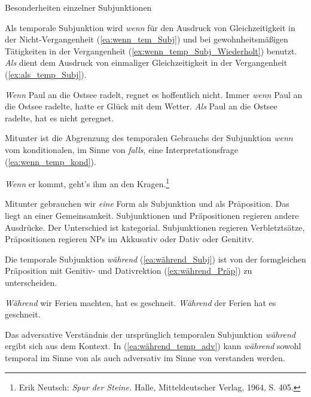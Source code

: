 \begin{Exkurs}{Besonderheiten einzelner Subjunktionen}\label{Exkurs:Subjunktionen}
    
Als temporale Subjunktion wird \textit{wenn} für den Ausdruck von Gleichzeitigkeit in der Nicht-Vergangenheit (\ref{ea:wenn_tem_Subj}) und bei gewohnheitsmäßigen Tätigkeiten in der Vergangenheit (\ref{ex:wenn_temp_Subj_Wiederholt}) benutzt. \textit{Als} dient dem Ausdruck von einmaliger Gleichzeitigkeit in der Vergangenheit (\ref{ex:als_temp_Subj}).

\newpage
\ea \label{ea:wenn_als_Subj_temp}
\ea \label{ea:wenn_tem_Subj} \textit{Wenn} Paul an die Ostsee radelt, regnet es hoffentlich nicht.
\ex \label{ex:wenn_temp_Subj_Wiederholt} Immer \textit{wenn} Paul an die Ostsee radelte, hatte er Glück mit dem Wetter.
\ex \label{ex:als_temp_Subj} \textit{Als} Paul an die Ostsee radelte, hat es nicht geregnet.
\z 
\z 

Mitunter ist die Abgrenzung des temporalen Gebrauchs der Subjunktion \textit{wenn} vom konditionalen, im Sinne von \textit{falls}, eine Interpretationsfrage (\ref{ea:wenn_temp_kond}).

\ea \label{ea:wenn_temp_kond} \textit{Wenn} er kommt, geht's ihm an den Kragen.\footnote{Erik Neutsch: \textit{Spur der Steine.} Halle, Mitteldeutscher Verlag, 1964, S. 405.}
\z 

Mitunter gebrauchen wir \textit{eine} Form als Subjunktion und als Präposition. Das liegt an einer Gemeinsamkeit. Subjunktionen und Präpositionen regieren andere Ausdrücke. Der Unterschied ist kategorial. Subjunktionen regieren Verbletztsätze, Präpositionen regieren NPs im Akkusativ oder Dativ oder Genititv.  

Die temporale Subjunktion \textit{während} (\ref{ea:während_Subj}) ist von der formgleichen Präposition mit Genitiv- und Dativrektion (\ref{ex:während_Präp}) zu unterscheiden. 

\ea \label{ea:während_Subj_Präp}
\ea \label{ea:während_Subj} \textit{Während} wir Ferien machten, hat es geschneit.
\ex \label{ex:während_Präp} \textit{Während} der Ferien hat es geschneit.
\z 
\z 

Das adversative Verständnis der ursprünglich temporalen Subjunktion \textit{während} ergibt sich aus dem Kontext. In (\ref{ea:während_temp_adv}) kann \textit{während} sowohl temporal im Sinne von  als auch adversativ im Sinne von  verstanden werden.


\end{Exkurs}
